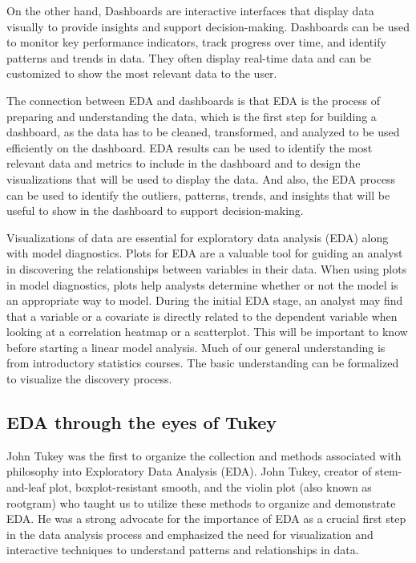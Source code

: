 \documentclass[print]{nuthesis}
\begin{document}
On the other hand, Dashboards are interactive interfaces that display data visually to provide insights and support decision-making. Dashboards can be used to monitor key performance indicators, track progress over time, and identify patterns and trends in data. They often display real-time data and can be customized to show the most relevant data to the user.

The connection between EDA and dashboards is that EDA is the process of preparing and understanding the data, which is the first step for building a dashboard, as the data has to be cleaned, transformed, and analyzed to be used efficiently on the dashboard. EDA results can be used to identify the most relevant data and metrics to include in the dashboard and to design the visualizations that will be used to display the data. And also, the EDA process can be used to identify the outliers, patterns, trends, and insights that will be useful to show in the dashboard to support decision-making.

Visualizations of data are essential for exploratory data analysis (EDA) along with model diagnostics.
Plots for EDA are a valuable tool for guiding an analyst in discovering the relationships between variables in their data.
When using plots in model diagnostics, plots help analysts determine whether or not the model is an appropriate way to model.
During the initial EDA stage, an analyst may find that a variable or a covariate is directly related to the dependent variable when looking at a correlation heatmap or a scatterplot.
This will be important to know before starting a linear model analysis.
Much of our general understanding is from introductory statistics courses.
The basic understanding can be formalized to visualize the discovery process.

\hypertarget{eda-through-the-eyes-of-tukey}{%
\subsection{EDA through the eyes of Tukey}\label{eda-through-the-eyes-of-tukey}}

John Tukey was the first to organize the collection and methods associated with philosophy into Exploratory Data Analysis (EDA). John Tukey, creator of stem-and-leaf plot, boxplot-resistant smooth, and the violin plot (also known as rootgram) who taught us to utilize these methods to organize and demonstrate EDA. He was a strong advocate for the importance of EDA as a crucial first step in the data analysis process and emphasized the need for visualization and interactive techniques to understand patterns and relationships in data.
\end{document}
